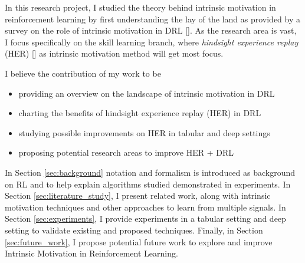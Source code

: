 \documentclass[conference]{IEEEtran}
\begin{document}
In this research project, I studied the theory behind intrinsic motivation in reinforcement learning by first understanding the lay of the land as provided by a survey on the role of intrinsic motivation in DRL [\cite{aubret2019survey}]. As the research area is vast, I focus specifically on the skill learning branch, where \textit{hindsight experience replay} (HER) [\cite{andrychowicz2017hindsight}] as intrinsic motivation method will get most focus.

I believe the contribution of my work to be
\begin{itemize}
    \item providing an overview on the landscape of intrinsic motivation in DRL
    \item charting the benefits of hindsight experience replay (HER) in DRL
    \item studying possible improvements on HER in tabular and deep settings
    \item proposing potential research areas to improve HER + DRL
\end{itemize}{}

In Section \ref{sec:background} notation and formalism is introduced as background on RL and to help explain algorithms studied demonstrated in experiments. In Section \ref{sec:literature_study}, I present related work, along with intrinsic motivation techniques and other approaches to learn from multiple signals. In Section \ref{sec:experiments}, I provide experiments in a tabular setting and deep setting to validate existing and proposed techniques. Finally, in Section \ref{sec:future_work}, I propose potential future work to explore and improve Intrinsic Motivation in Reinforcement Learning.
\end{document}
